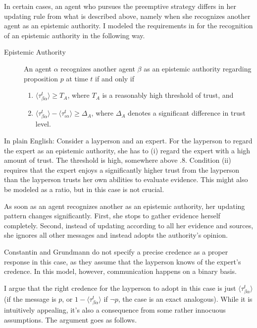 \documentclass[11pt, a4paper]{scrartcl}
\begin{document}
In certain cases, an agent who pursues the preemptive strategy differs in her updating rule from what is described above, namely when she recognizes another agent as an epistemic authority. I modeled the requirements in \textcite[p.9]{Constantin2017} for the recognition of an epistemic authority in the following way. 
\begin{description} 
    \item[Epistemic Authority] An agent $\alpha$ recognizes another agent $\beta$ as an epistemic authority regarding proposition $p$ at time $t$ if and only if  
    \begin{enumerate}[label= (\roman*)]
        \item $\langle \tau^t_{\beta\alpha} \rangle \geqslant T_A$, where $T_A$ is a reasonably high threshold of trust, and
        \item $\langle \tau^t_{\beta\alpha} \rangle - \langle \tau^t_{\iota\alpha} \rangle \geqslant \Delta_A$, where $\Delta_A$ denotes a significant difference in trust level.
    \end{enumerate}


\end{description}
    In plain English: Consider a layperson and an expert. For the layperson to regard the expert as an epistemic authority, she has to (i) regard the expert with a high amount of trust. The threshold is high, somewhere above $.8$. Condition (ii) requires that the expert enjoys a significantly higher trust from the layperson than the layperson trusts her own abilities to evaluate evidence. This might also be modeled as a ratio, but in this case is not crucial.

As soon as an agent recognizes another as an epistemic authority, her updating pattern changes significantly. First, she stops to gather evidence herself completely. Second, instead of updating according to all her evidence and sources, she ignores all other messages and instead adopts the authority's opinion.

Constantin and Grundmann do not specify a precise credence as a proper response in this case, as they assume that the layperson knows of the expert's credence. In this model, however, communication happens on a binary basis.
 
I argue that the right credence for the layperson to adopt in this case is just $\langle \tau^t_{\beta\alpha} \rangle$ (if the message is $p$, or $1 - \langle \tau^t_{\beta\alpha} \rangle$ if $\neg p$, the case is an exact analogous). While it is intuitively appealing, it's also a consequence from some rather innocuous assumptions. The argument goes as follows. 
\end{document}
